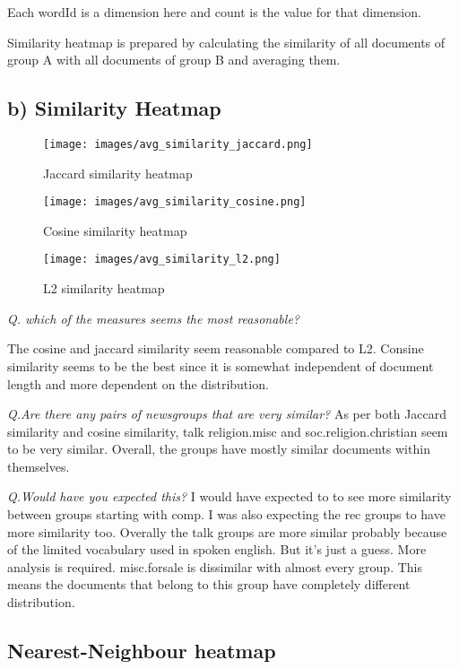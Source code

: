 \documentclass{homeworg}
\let\Oldsubsection\subsection
\renewcommand{\subsection}{\FloatBarrier\Oldsubsection}
\begin{document}
Each wordId is a dimension here and count is the value for that dimension. 

Similarity heatmap is prepared by calculating the similarity of all documents of group A with all documents of group B and averaging them.
\subsection{b) Similarity Heatmap}
\begin{figure}[!htbp]
    \centering
    \texttt{[image: images/avg\_similarity\_jaccard.png]}
    \caption{Jaccard similarity heatmap}
    \label{fig:hm_jaccard}
\end{figure}

\begin{figure}[!htbp]
    \centering
    \texttt{[image: images/avg\_similarity\_cosine.png]}
    \caption{Cosine similarity heatmap}
    \label{fig:hm_cosine}
\end{figure}

\begin{figure}[!htbp]
    \centering
    \texttt{[image: images/avg\_similarity\_l2.png]}
    \caption{L2 similarity heatmap}
    \label{fig:hm_l2}
\end{figure}
\newpage
\emph{Q. which of the measures seems the most reasonable? }

The cosine and jaccard similarity seem reasonable compared to L2. Consine similarity seems to be the best since it is somewhat independent of document length and more dependent on the distribution.

\emph{Q.Are there any pairs of newsgroups that are very similar? }
As per both Jaccard similarity and cosine similarity, talk religion.misc and soc.religion.christian seem to be very similar. Overall, the groups have mostly similar documents within themselves.

\emph{Q.Would have you expected this?}
I would have expected to to see more similarity between groups starting with comp.
I was also expecting the rec groups to have more similarity too. Overally the talk groups are more similar probably because of the limited vocabulary used in spoken english. But it's just a guess. More analysis is required. misc.forsale is dissimilar with almost every group. This means the documents that belong to this group have completely different distribution.

\subsection{Nearest-Neighbour heatmap}
\end{document}
